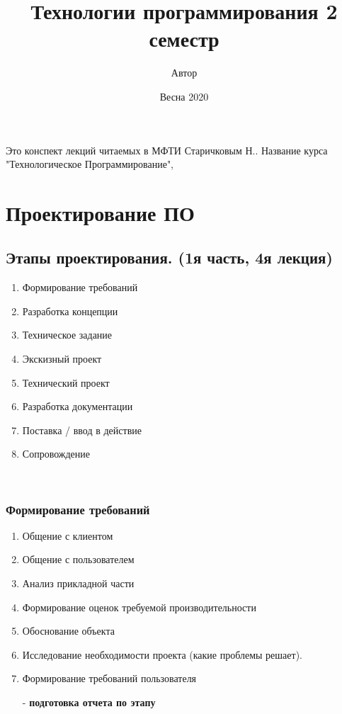\documentclass[12pt; a4paper]{book}
\theoremstyle{plain} %
\theoremstyle{defenition}
\theoremstyle{remark}
\begin{document}
 
\let\ms\mathscr  %
\let\ol\overline  %
\let\bs\boldsymbol
\let\ra\rightarrow
\let\b\begin
\let\e\end
\let\it\item
\let\subs\subsection
\let\ns\normalsize
\let\tb\textbf
\large

\frontmatter
\title{Технологии программирования 2 семестр}
\author{Автор} 
\date{Весна 2020}
\maketitle
Это конспект лекций читаемых в МФТИ Старичковым Н.. Название курса "Технологическое Программирование", 


\tableofcontents

\mainmatter
\chapter{Проектирование ПО}

\section{Этапы проектирования. (1я часть, 4я лекция)}
\begin{enumerate}
\item Формирование требований
\item Разработка концепции
\item Техническое задание
\item Экскизный проект
\item Технический проект
\item Разработка документации
\item Поставка / ввод в действие
\item Сопровождение
\end{enumerate}\

\subsection{Формирование требований}
\begin{enumerate}
\item Общение с клиентом
\item Общение с пользователем
\item Анализ прикладной части
\item Формирование оценок требуемой производительности
\item Обоснование объекта
\item Исследование необходимости проекта (какие проблемы решает).
\item Формирование требований пользователя
\item[-] \textbf{подготовка отчета по этапу}
\end{enumerate}
\end{document}
